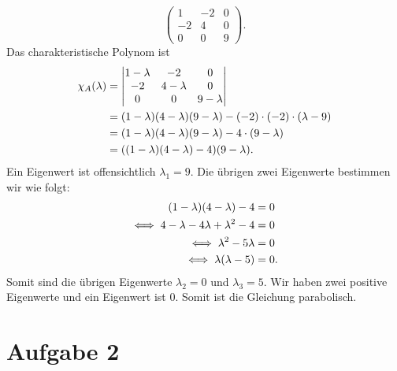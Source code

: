 \documentclass{exercise}
\begin{document}
\begin{enumerate}
\[\begin{pmatrix}
                1 & -2 & 0\\
                -2 & 4 & 0\\
                0 & 0 & 9
            \end{pmatrix}.
        \]
        Das charakteristische Polynom ist
        \begin{align*}
            \chi_A\parentheses*{\lambda} &= \begin{vmatrix}
                1 - \lambda & -2 & 0\\
                -2 & 4 - \lambda & 0\\
                0 & 0 & 9 - \lambda
            \end{vmatrix}\\
            &= \parentheses*{1 - \lambda}\parentheses*{4 - \lambda}\parentheses*{9 - \lambda} - \parentheses*{-2} \cdot \parentheses*{-2} \cdot \parentheses*{\lambda - 9}\\
            &= \parentheses*{1 - \lambda}\parentheses*{4 - \lambda}\parentheses*{9 - \lambda} - 4 \cdot \parentheses*{9 - \lambda}\\
            &= \parentheses*{\parentheses*{1 - \lambda}\parentheses*{4 - \lambda} - 4}\parentheses*{9 - \lambda}.
        \end{align*}
        Ein Eigenwert ist offensichtlich \(\lambda_1 = 9\).
        Die übrigen zwei Eigenwerte bestimmen wir wie folgt:
        \begin{align*}
            \parentheses*{1 - \lambda}\parentheses*{4 - \lambda} - 4 &= 0\\
            \iff 4 - \lambda - 4\lambda + \lambda^2 - 4 &= 0\\
            \iff \lambda^2 - 5\lambda &= 0\\
            \iff \lambda\parentheses*{\lambda - 5} &= 0.
        \end{align*}
        Somit sind die übrigen Eigenwerte \(\lambda_2 = 0\) und \(\lambda_3 = 5\).
        Wir haben zwei positive Eigenwerte und ein Eigenwert ist \(0\).
        Somit ist die Gleichung parabolisch.
    \end{enumerate}


    \section*{Aufgabe 2}
    
    \begin{problem}
        
    \end{problem}
    
\end{document}

